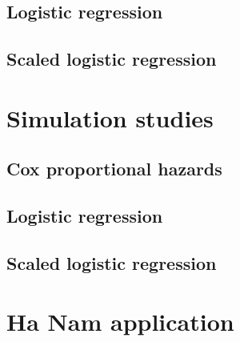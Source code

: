 \documentclass[12pt]{article}
\begin{document}
\subsection{Logistic regression}



\subsection{Scaled logistic regression}



\section{Simulation studies}



\subsection{Cox proportional hazards}



\subsection{Logistic regression}



\subsection{Scaled logistic regression}



\section{Ha Nam application}


\end{document}
